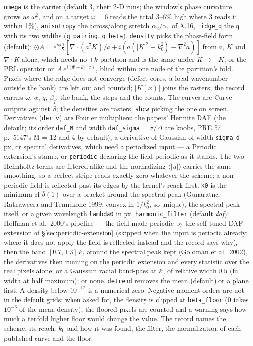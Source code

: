 \documentclass[10pt]{article}
\begin{document}
\texttt{omega} is the carrier (default 3, their 2-D runs; the window's phase curvature grows as
$\omega^2$, and on a target $\omega = 6$ reads the total 3--6\% high where 3 reads it within 1\%),
\texttt{anisotropy} the across/along stretch $\alpha_2/\alpha_1$ of A.16, \texttt{ridge\_q} the
q with its two widths (\texttt{q\_pairing}, \texttt{q\_beta}). \texttt{density} picks the
phase-field form (default): $\odot A = e^{i\phi}\tfrac12[\nabla\!\cdot\!(a^2K)/a + i(a(|K|^2 -
k_0^2) - \nabla^2 a)]$ from $a$, $K$ and $\nabla\!\cdot\!K$ alone, which needs no $\pm k$ partition
and is the same under $K \to -K$; or the PRL operator on $A\,e^{i(\Psi - k_0\cdot x)}$, blind within
one node of the partition's fold. Pixels where the ridge does not converge (defect cores, a local
wavenumber outside the bank) are left out and counted; $|K(x)|$ joins the rasters; the record
carries $\omega$, $\alpha$, $q$, $\beta_q$, the bank, the steps and the counts. The curves are Curve outputs against
$\beta$; the densities are rasters, \texttt{show} picking the one on screen. Derivatives (\texttt{deriv}) are
Fourier multipliers: the papers' Hermite DAF (the default; its order \texttt{daf\_M} and width
\texttt{daf\_sigma} = $\sigma/\Delta$ are knobs, PRE 57 p.~5147's M = 12 and 4 by default), a
derivative of Gaussian of width \texttt{sigma\_d} px, or spectral derivatives, which
need a periodized input --- a Periodic extension's stamp, or \texttt{periodic} declaring the field
periodic as it stands. The two Helmholtz terms are filtered alike and the normalizing
$\langle|u|\rangle$ carries the same smoothing, so a perfect stripe reads exactly zero whatever the
scheme; a non-periodic field is reflected past its edges by the kernel's reach first. \texttt{k0}
is the minimum of $\bar\delta(1)$ over a bracket around the spectral peak (Gunaratne, Ratnaweera
and Tennekone 1999; convex in $1/k_0^2$, so unique), the spectral peak itself, or a given
wavelength \texttt{lambda0} in px. \texttt{harmonic\_filter} (default \emph{daf}): Hoffman et al.\
2000's pipeline --- the field made periodic by the self-tuned DAF extension of
\S\ref{sec:periodic-extension} (skipped when the input is periodic already; where it does not
apply the field is reflected instead and the record says why), then the band $[0.7, 1.3]\,k_t$
around the spectral peak kept (Goldman et al.\ 2002), the derivatives then running on the periodic
extension and every statistic over the real pixels alone; or a Gaussian radial band-pass at $k_0$
of relative width 0.5 (full width at half maximum); or none.
\texttt{detrend} removes the mean (default) or a plane first. A density below $10^{-12}$ is a numerical zero. Negative moment orders are not in the
default grids; when asked for, the density is clipped at \texttt{beta\_floor} (0 takes $10^{-6}$ of
the mean density), the floored pixels are counted and a warning says how much a tenfold higher
floor would change the value. The record names the scheme, its reach, $k_0$ and how it was found,
the filter, the normalization of each published curve and the floor.
\end{document}
